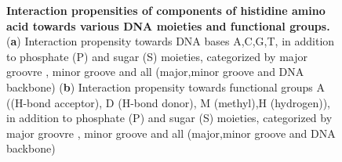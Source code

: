 \begin{center}
    \begin{figure}[H]
        \caption[Interaction propensities of components of histidine amino acid towards various DNA moieties and functional groups]{\textbf{ Interaction propensities of components of histidine amino acid towards various DNA moieties and functional groups.} ({\bf a}) Interaction  propensity towards DNA bases  A,C,G,T, in addition to phosphate (P) and sugar (S) moieties, categorized by major groovre , minor groove and all (major,minor groove and DNA backbone) ({\bf b}) Interaction  propensity towards functional groups \citep{Chiu2023} A ((H-bond acceptor), D (H-bond donor), M (methyl),H (hydrogen)), in addition to phosphate (P) and sugar (S) moieties, categorized by major groovre , minor groove and all (major,minor groove and DNA backbone)}
  \label{fig:his}
\end{figure}
\end{center}

